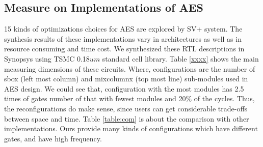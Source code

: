 \subsection{Measure on Implementations of AES}
15 kinds of optimizations choices for AES are explored by SV+ system. The synthesis results of these implementations vary in architectures as well as in resource consuming and time cost. We synthesized these RTL descriptions in Synopsys using TSMC 0.18$um$ standard cell library. Table \ref{xxxx} shows the main measuring dimensions of these circuits. Where, configurations are the number of sbox (left most column) and mixcolumnx (top most line) sub-modules used in AES design. We could see that, configuration with the most modules has 2.5 times of gates number of that with fewest modules and 20\% of the cycles. Thus, the reconfigurations do make sense, since users can get considerable trade-offs between space and time. Table \ref{table:com} is about the comparison with other implementations. Ours provide many kinds of configurations which have different gates, and have high frequency.
\begin{table}[h]
\centering
\caption{Area and time cost of AES}
\label{xxxx}
\end{table}
